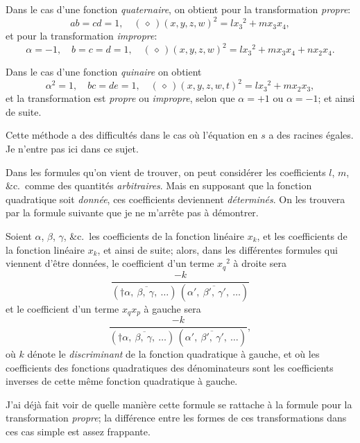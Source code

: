 \documentclass[11pt,a4paper]{article}
\begin{document}
\medskip

Dans le cas d'une fonction \textit{quaternaire}, on obtient pour la transformation \textit{propre}:
\[
ab = cd = 1,\quad (\,\diamond\,)(x, y, z, w)^2 = l x_3{}^2 + m x_3 x_4,
\]
et pour la transformation \textit{impropre}:
\[
\alpha = -1,\quad b = c = d = 1,\quad (\,\diamond\,)(x, y, z, w)^2 = l x_3{}^2 + m x_3 x_4 + n x_2 x_4.
\]

\medskip

Dans le cas d'une fonction \textit{quinaire} on obtient
\[
\alpha^2 = 1,\quad bc = de = 1,\quad (\,\diamond\,)(x, y, z, w, t)^2 = l x_3{}^2 + m x_2 x_3,
\]
et la transformation est \textit{propre} ou \textit{impropre}, selon que $\alpha = +1$ ou $\alpha = -1$; et ainsi de suite.

\medskip

Cette m\'ethode a des difficult\'es dans le cas o\`u l'\'equation en $s$ a des racines \'egales. Je n'entre pas ici dans ce sujet.

\medskip

Dans les formules qu'on vient de trouver, on peut consid\'erer les coefficients $l$, $m$, \&c.\ comme des quantit\'es \textit{arbitraires}. Mais en supposant que la fonction quadratique soit \textit{donn\'ee}, ces coefficients deviennent \textit{d\'etermin\'es}. On les trouvera par la formule suivante que je ne m'arr\^ete pas \`a d\'emontrer.

\medskip

Soient $\alpha$, $\beta$, $\gamma$, \&c.\ les coefficients de la fonction lin\'eaire $x_k$, et les coefficients de la fonction lin\'eaire $x_k$, et ainsi de suite; alors, dans les diff\'erentes formules qui viennent d'\^etre donn\'ees, le coefficient d'un terme $x_q{}^2$ \`a droite sera
\[
\frac{-k}{(\dagger\overline{\alpha,\ \beta,\ \gamma,\ \ldots})\,(\overline{\alpha',\ \beta',\ \gamma',\ \ldots})}
\]
et le coefficient d'un terme $x_q x_p$ \`a gauche sera
\[
\frac{-k}{(\dagger\overline{\alpha,\ \beta,\ \gamma,\ \ldots})\,(\overline{\alpha',\ \beta',\ \gamma',\ \ldots})},
\]
o\`u $k$ d\'enote le \textit{discriminant} de la fonction quadratique \`a gauche, et o\`u les coefficients des fonctions quadratiques des d\'enominateurs sont les coefficients inverses de cette m\^eme fonction quadratique \`a gauche.

\medskip

J'ai d\'ej\`a fait voir de quelle mani\`ere cette formule se rattache \`a la formule pour la transformation \textit{propre}; la diff\'erence entre les formes de ces transformations dans ces cas simple est assez frappante.
\end{document}
